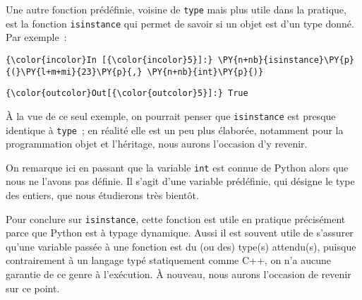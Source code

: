     Une autre fonction prédéfinie, voisine de \texttt{type} mais plus utile
dans la pratique, est la fonction \texttt{isinstance} qui permet de
savoir si un objet est d'un type donné. Par exemple~:

    \begin{Verbatim}[commandchars=\\\{\}]
{\color{incolor}In [{\color{incolor}5}]:} \PY{n+nb}{isinstance}\PY{p}{(}\PY{l+m+mi}{23}\PY{p}{,} \PY{n+nb}{int}\PY{p}{)}
\end{Verbatim}


\begin{Verbatim}[commandchars=\\\{\}]
{\color{outcolor}Out[{\color{outcolor}5}]:} True
\end{Verbatim}
            
    À la vue de ce seul exemple, on pourrait penser que \texttt{isinstance}
est presque identique à \texttt{type}~; en réalité elle est un peu plus
élaborée, notamment pour la programmation objet et l'héritage, nous
aurons l'occasion d'y revenir.

    On remarque ici en passant que la variable \texttt{int} est connue de
Python alors que nous ne l'avons pas définie. Il s'agit d'une variable
prédéfinie, qui désigne le type des entiers, que nous étudierons très
bientôt.

    Pour conclure sur \texttt{isinstance}, cette fonction est utile en
pratique précisément parce que Python est à typage dynamique. Aussi il
est souvent utile de s'assurer qu'une variable passée à une fonction est
du (ou des) type(s) attendu(s), puisque contrairement à un langage typé
statiquement comme C++, on n'a aucune garantie de ce genre à
l'exécution. À nouveau, nous aurons l'occasion de revenir sur ce point.


    
    
    
